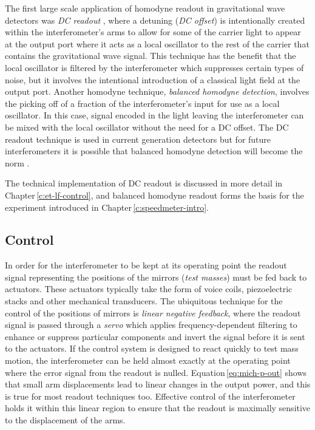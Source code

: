 The first large scale application of homodyne readout in gravitational wave detectors was \emph{\gls{DC} readout} \cite{Fricke2012}, where a detuning (\emph{\gls{DC} offset}) is intentionally created within the interferometer's arms to allow for some of the carrier light to appear at the output port where it acts as a local oscillator to the rest of the carrier that contains the gravitational wave signal. This technique has the benefit that the local oscillator is filtered by the interferometer which suppresses certain types of noise, but it involves the intentional introduction of a classical light field at the output port. Another homodyne technique, \emph{balanced homodyne detection}, involves the picking off of a fraction of the interferometer's input for use as a local oscillator. In this case, signal encoded in the light leaving the interferometer can be mixed with the local oscillator without the need for a \gls{DC} offset. The \gls{DC} readout technique is used in current generation detectors but for future interferometers it is possible that balanced homodyne detection will become the norm \cite{Gard2016}.

The technical implementation of \gls{DC} readout is discussed in more detail in Chapter\,\ref{c:et-lf-control}, and balanced homodyne readout forms the basis for the experiment introduced in Chapter\,\ref{c:speedmeter-intro}.

\subsection{Control}
In order for the interferometer to be kept at its operating point the readout signal representing the positions of the mirrors (\emph{test masses}) must be fed back to actuators. These actuators typically take the form of voice coils, piezoelectric stacks and other mechanical transducers. The ubiquitous technique for the control of the positions of mirrors is \emph{linear negative feedback}, where the readout signal is passed through a \emph{servo} which applies frequency-dependent filtering to enhance or suppress particular components and invert the signal before it is sent to the actuators. If the control system is designed to react quickly to test mass motion, the interferometer can be held almost exactly at the operating point where the error signal from the readout is nulled. Equation\,\ref{eq:mich-p-out} shows that small arm displacements lead to linear changes in the output power, and this is true for most readout techniques too. Effective control of the interferometer holds it within this linear region to ensure that the readout is maximally sensitive to the displacement of the arms.

